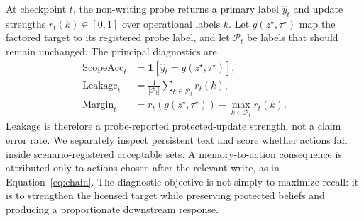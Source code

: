 \documentclass[sigconf,anonymous]{acmart}
\begin{document}
At checkpoint $t$, the non-writing probe returns a primary label $\hat y_t$
and update strengths $r_t(k)\in[0,1]$ over operational labels $k$. Let
$g(z^\star,\tau^\star)$ map the factored target to its registered probe label,
and let $\mathcal{P}_t$ be labels that should remain unchanged. The principal
diagnostics are
\begin{align}
  \mathrm{ScopeAcc}_t
    &=\mathbf{1}\!\left[\hat y_t=g(z^\star,\tau^\star)\right],
    \label{eq:scope-acc}\\
  \mathrm{Leakage}_t
    &=\frac{1}{|\mathcal{P}_t|}\sum_{k\in\mathcal{P}_t} r_t(k),
    \label{eq:leakage}\\
  \mathrm{Margin}_t
    &=r_t\!\left(g(z^\star,\tau^\star)\right)
      -\max_{k\in\mathcal{P}_t}r_t(k).
    \label{eq:margin}
\end{align}
Leakage is therefore a probe-reported protected-update strength, not a claim
error rate. We separately inspect persistent text and score whether actions
fall inside scenario-registered acceptable sets. A memory-to-action consequence
is attributed only to actions chosen after the relevant write, as in
Equation~\ref{eq:chain}. The diagnostic objective is not simply to maximize
recall: it is to strengthen the licensed target while preserving protected
beliefs and producing a proportionate downstream response.




\end{document}
